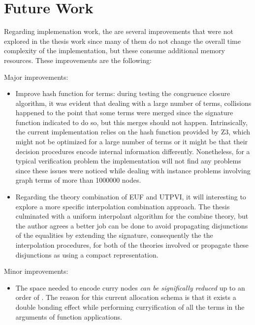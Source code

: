 \chapter{Future Work}

Regarding implemenation work, the are several improvements that were not explored 
in the thesis work since many of them do not change the overall time complexity 
of the implementation, but these consume additional memory resources. 
These improvements are the following:

Major improvements:

\begin{itemize}
  \item Improve hash function for terms: during testing the congruence closure
    algorithm, it was evident that dealing with a large number of terms, collisions
    happened  to the point that some terms were merged since the signature
    function indicated to do so, but this merges should not happen. 
    Intrinsically, the current implementation relies on the hash function 
    provided by Z3, which might not be optimized
    for a large number of terms or it might
    be that their decision procedures
    encode internal information differently.
    Nonetheless, for
    a typical verification problem the implementation will not 
    find any problems since these
    issues were noticed while dealing with
    instance problems involving graph terms
    of more than 1000000 nodes.
  \item Regarding the theory combination 
    of EUF and UTPVI, it will interesting 
    to explore a
    more specific interpolation 
    combination approach. The thesis 
    culminated with a 
    uniform interpolant algorithm for the
    combine theory, but the author agrees 
    a better job can be done to avoid 
    propagating disjunctions of the equalities
    by extending the signature, 
    consequently the the interpolation 
    procedures, for both of the theories 
    involved or propagate these disjunctions as
    using a compact representation.
\end{itemize}

Minor improvements:

\begin{itemize}
  \item The space needed to encode curry nodes \emph{can be significally 
    reduced} up to an order of . The reason for 
    this current allocation schema is that it exists a 
    double bonding effect while performing curryification 
    of all the terms in the arguments of function applications.
\end{itemize}


